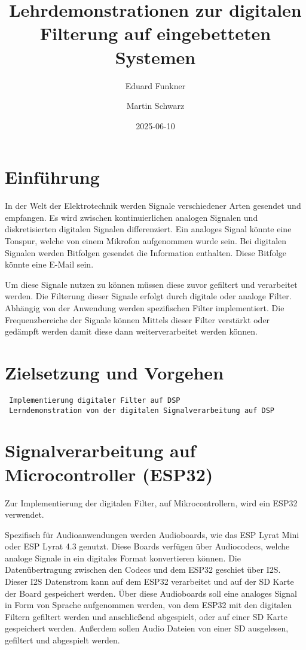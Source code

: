 \documentclass[
  ngerman,
  letterpaper,
  DIV=11]{scrreprt}
\title{Lehrdemonstrationen zur digitalen Filterung auf eingebetteten
Systemen}
\author{Eduard Funkner \and Martin Schwarz}
\date{2025-06-10}
\renewcommand*\contentsname{Inhaltsverzeichnis}
\newcommand\contentsname{Inhaltsverzeichnis}
\begin{document}
\maketitle

\renewcommand*\contentsname{Inhaltsverzeichnis}
{
\hypersetup{linkcolor=}
\setcounter{tocdepth}{2}
\tableofcontents
}

\chapter{Einführung}\label{einfuxfchrung}

In der Welt der Elektrotechnik werden Signale verschiedener Arten
gesendet und empfangen. Es wird zwischen kontinuierlichen analogen
Signalen und diskretisierten digitalen Signalen differenziert. Ein
analoges Signal könnte eine Tonspur, welche von einem Mikrofon
aufgenommen wurde sein. Bei digitalen Signalen werden Bitfolgen gesendet
die Information enthalten. Diese Bitfolge könnte eine E-Mail sein.

Um diese Signale nutzen zu können müssen diese zuvor gefiltert und
verarbeitet werden. Die Filterung dieser Signale erfolgt durch digitale
oder analoge Filter. Abhängig von der Anwendung werden spezifischen
Filter implementiert. Die Frequenzbereiche der Signale können Mittels
dieser Filter verstärkt oder gedämpft werden damit diese dann
weiterverarbeitet werden können.

\chapter{Zielsetzung und Vorgehen}\label{zielsetzung-und-vorgehen}

\begin{verbatim}
 Implementierung digitaler Filter auf DSP
 Lerndemonstration von der digitalen Signalverarbeitung auf DSP
\end{verbatim}

\chapter{Signalverarbeitung auf Microcontroller
(ESP32)}\label{signalverarbeitung-auf-microcontroller-esp32}

Zur Implementierung der digitalen Filter, auf Mikrocontrollern, wird ein
ESP32 verwendet.

Spezifisch für Audioanwendungen werden Audioboards, wie das ESP Lyrat
Mini oder ESP Lyrat 4.3 genutzt. Diese Boards verfügen über Audiocodecs,
welche analoge Signale in ein digitales Format konvertieren können. Die
Datenübertragung zwischen den Codecs und dem ESP32 geschiet über I2S.
Dieser I2S Datenstrom kann auf dem ESP32 verarbeitet und auf der SD
Karte der Board gespeichert werden. Über diese Audioboards soll eine
analoges Signal in Form von Sprache aufgenommen werden, von dem ESP32
mit den digitalen Filtern gefiltert werden und anschließend abgespielt,
oder auf einer SD Karte gespeichert werden. Außerdem sollen Audio
Dateien von einer SD ausgelesen, gefiltert und abgespielt werden.
\end{document}
